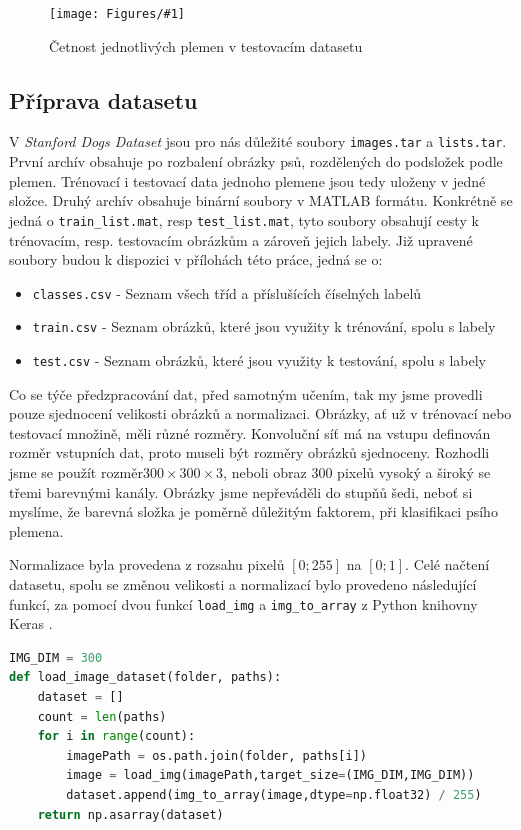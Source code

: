 \documentclass[a4paper,12pt]{article}
\newcommand{\image}[4]{\begin{figure}[ht!] \centering \texttt{[image: Figures/\#1]} \caption{#2} \label{#3} \end{figure}}
\begin{document}
\image{test_distribution.pdf}{Četnost jednotlivých plemen v testovacím datasetu}{fig:test_breed_dist}{0.65}

\subsection{Příprava datasetu}
V \emph{Stanford Dogs Dataset} jsou pro nás důležité soubory \texttt{images.tar} a \texttt{lists.tar}. První archív obsahuje po rozbalení obrázky psů, rozdělených do podsložek podle plemen. Trénovací i testovací data jednoho plemene jsou tedy uloženy v jedné složce. Druhý archív obsahuje binární soubory v MATLAB formátu.
Konkrétně se jedná o \texttt{train\_list.mat}, resp \texttt{test\_list.mat}, tyto soubory obsahují cesty k trénovacím, resp. testovacím obrázkům a zároveň jejich labely. Již upravené soubory budou k dispozici v přílohách této práce, jedná se o:

\begin{itemize}
    \item \texttt{classes.csv} - Seznam všech tříd a příslušících číselných labelů
    \item \texttt{train.csv} - Seznam obrázků, které jsou využity k trénování, spolu s labely
    \item \texttt{test.csv} - Seznam obrázků, které jsou využity k testování, spolu s labely
\end{itemize}

Co se týče předzpracování dat, před samotným učením, tak my jsme provedli pouze sjednocení velikosti obrázků a normalizaci. Obrázky, ať už v trénovací nebo testovací množině, měli různé rozměry. Konvoluční síť má na vstupu definován rozměr vstupních dat, proto museli být rozměry obrázků sjednoceny. Rozhodli jsme se použít rozměr\linebreak $300 \times 300 \times 3$, neboli obraz 300 pixelů vysoký a široký se třemi barevnými kanály. Obrázky jsme nepřeváděli do stupňů šedi, neboť si myslíme, že barevná složka je poměrně důležitým faktorem, při klasifikaci psího plemena.

Normalizace byla provedena z rozsahu pixelů $[0;255]$ na $[0;1]$. Celé načtení datasetu, spolu se změnou velikosti a normalizací bylo provedeno následující funkcí, za pomocí dvou funkcí \texttt{load\_img} a \texttt{img\_to\_array} z Python knihovny Keras \cite{chollet2015keras}.

\begin{lstlisting}[language=Python]
IMG_DIM = 300
def load_image_dataset(folder, paths):
    dataset = []
    count = len(paths)
    for i in range(count):
        imagePath = os.path.join(folder, paths[i])
        image = load_img(imagePath,target_size=(IMG_DIM,IMG_DIM))
        dataset.append(img_to_array(image,dtype=np.float32) / 255)
    return np.asarray(dataset)
\end{lstlisting}
\end{document}
